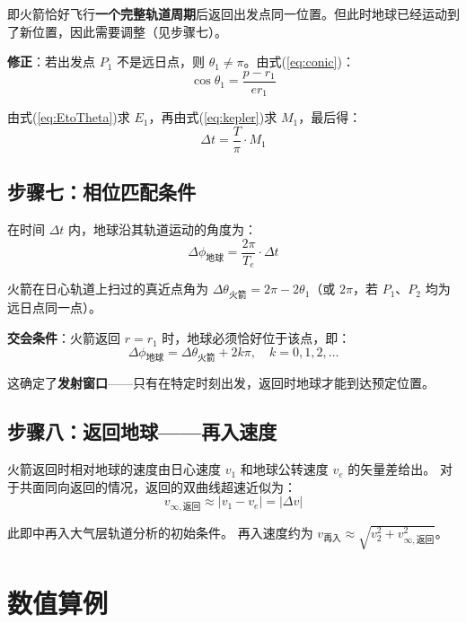 \documentclass[UTF8,12pt,a4paper]{ctexart}
\begin{document}
即火箭恰好飞行\textbf{一个完整轨道周期}后返回出发点同一位置。但此时地球已经运动到了新位置，因此需要调整（见步骤七）。

\textbf{修正}：若出发点 $P_1$ 不是远日点，则 $\theta_1 \neq \pi$。由式(\ref{eq:conic})：
\begin{equation}
    \cos\theta_1 = \frac{p - r_1}{e r_1}
\end{equation}

由式(\ref{eq:EtoTheta})求 $E_1$，再由式(\ref{eq:kepler})求 $M_1$，最后得：
\begin{equation}
    \Delta t = \frac{T}{\pi} \cdot M_1
\end{equation}

\subsection{步骤七：相位匹配条件}

在时间 $\Delta t$ 内，地球沿其轨道运动的角度为：
\begin{equation}
    \Delta\phi_{\text{地球}} = \frac{2\pi}{T_e} \cdot \Delta t
\end{equation}

火箭在日心轨道上扫过的真近点角为 $\Delta\theta_{\text{火箭}} = 2\pi - 2\theta_1$（或 $2\pi$，若 $P_1$、$P_2$ 均为远日点同一点）。

\textbf{交会条件}：火箭返回 $r = r_1$ 时，地球必须恰好位于该点，即：
\begin{equation}\label{eq:phasing}
    \Delta\phi_{\text{地球}} = \Delta\theta_{\text{火箭}} + 2k\pi, \quad k = 0,1,2,\ldots
\end{equation}

这确定了\textbf{发射窗口}——只有在特定时刻出发，返回时地球才能到达预定位置。

\subsection{步骤八：返回地球——再入速度}

火箭返回时相对地球的速度由日心速度 $v_1$ 和地球公转速度 $v_e$ 的矢量差给出。
对于共面同向返回的情况，返回的双曲线超速近似为：
\begin{equation}
    v_{\infty,\text{返回}} \approx |v_1 - v_e| = |\Delta v|
\end{equation}

此即\cite[\S10.2, pp.~849]{qian2008}中再入大气层轨道分析的初始条件。
再入速度约为 $v_{\text{再入}} \approx \sqrt{v_2^2 + v_{\infty,\text{返回}}^2}$。

\section{数值算例}
\end{document}
